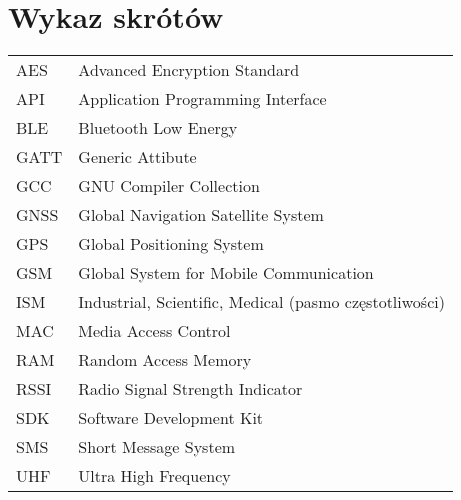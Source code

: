\chapter*{Wykaz skrótów}

\begin{tabular}{l l}
AES & Advanced Encryption Standard \\
API & Application Programming Interface \\
BLE & Bluetooth Low Energy \\
GATT & Generic Attibute \\
GCC & GNU Compiler Collection \\
GNSS & Global Navigation Satellite System \\
GPS & Global Positioning System \\
GSM & Global System for Mobile Communication \\
ISM & Industrial, Scientific, Medical (pasmo częstotliwości) \\
MAC & Media Access Control \\
RAM & Random Access Memory \\
RSSI & Radio Signal Strength Indicator \\
SDK & Software Development Kit \\
SMS & Short Message System \\
UHF & Ultra High Frequency \\




\end{tabular}
